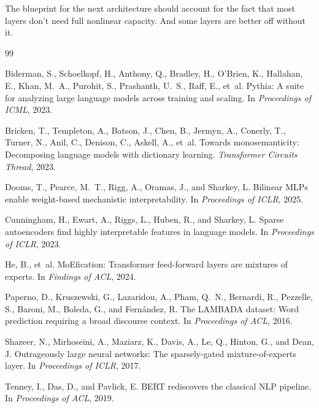 \documentclass[11pt]{article}
\begin{document}
The blueprint for the next architecture should account for the fact that most layers don't need full nonlinear capacity. And some layers are better off without it.

\begin{thebibliography}{99}

Biderman, S., Schoelkopf, H., Anthony, Q., Bradley, H., O'Brien, K., Hallahan, E., Khan, M.~A., Purohit, S., Prashanth, U.~S., Raff, E., et~al.
\newblock Pythia: A suite for analyzing large language models across training and scaling.
\newblock In \textit{Proceedings of ICML}, 2023.

Bricken, T., Templeton, A., Batson, J., Chen, B., Jermyn, A., Conerly, T., Turner, N., Anil, C., Denison, C., Askell, A., et~al.
\newblock Towards monosemanticity: Decomposing language models with dictionary learning.
\newblock \textit{Transformer Circuits Thread}, 2023.

Dooms, T., Pearce, M.~T., Rigg, A., Oramas, J., and Sharkey, L.
\newblock Bilinear MLPs enable weight-based mechanistic interpretability.
\newblock In \textit{Proceedings of ICLR}, 2025.

Cunningham, H., Ewart, A., Riggs, L., Huben, R., and Sharkey, L.
\newblock Sparse autoencoders find highly interpretable features in language models.
\newblock In \textit{Proceedings of ICLR}, 2023.

He, B., et~al.
\newblock MoEfication: Transformer feed-forward layers are mixtures of experts.
\newblock In \textit{Findings of ACL}, 2024.

Paperno, D., Kruszewski, G., Lazaridou, A., Pham, Q.~N., Bernardi, R., Pezzelle, S., Baroni, M., Boleda, G., and Fernández, R.
\newblock The LAMBADA dataset: Word prediction requiring a broad discourse context.
\newblock In \textit{Proceedings of ACL}, 2016.

Shazeer, N., Mirhoseini, A., Maziarz, K., Davis, A., Le, Q., Hinton, G., and Dean, J.
\newblock Outrageously large neural networks: The sparsely-gated mixture-of-experts layer.
\newblock In \textit{Proceedings of ICLR}, 2017.

Tenney, I., Das, D., and Pavlick, E.
\newblock BERT rediscovers the classical NLP pipeline.
\newblock In \textit{Proceedings of ACL}, 2019.


\end{thebibliography}
\end{document}
